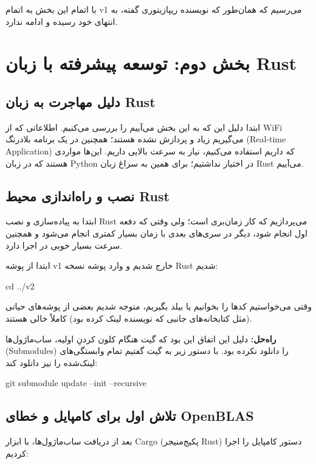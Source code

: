 \documentclass[12pt, a4paper]{article}
\newcommand{\lr}[1]{\foreignlanguage{english}{#1}}
\begin{document}
با اتمام این بخش به اتمام \lr{v1} می‌رسیم که همان‌طور که نویسنده ریپازیتوری گفته، به انتهای خود رسیده و ادامه ندارد.

\newpage
\section{بخش دوم: توسعه پیشرفته با زبان \lr{Rust}}

\subsection{دلیل مهاجرت به زبان \lr{Rust}}
ابتدا دلیل این که به این بخش می‌آییم را بررسی می‌کنیم. اطلاعاتی که از \lr{WiFi} می‌گیریم زیاد و پردازش نشده هستند؛ همچنین در یک برنامه بلادرنگ (\lr{Real-time Application}) که داریم استفاده می‌کنیم، نیاز به سرعت بالایی داریم. این‌ها مواردی هستند که در زبان \lr{Python} در اختیار نداشتیم؛ برای همین به سراغ زبان \lr{Rust} می‌آییم.

\subsection{نصب و راه‌اندازی محیط \lr{Rust}}
ابتدا به پیاده‌سازی و نصب \lr{Rust} می‌پردازیم که کار زمان‌بری است؛ ولی وقتی که دفعه اول انجام شود، دیگر در سری‌های بعدی با زمان بسیار کمتری انجام می‌شود و همچنین سرعت بسیار خوبی در اجرا دارد.

ابتدا از پوشه \lr{v1} خارج شدیم و وارد پوشه نسخه \lr{Rust} شدیم:

\begin{otherlanguage}{english}
\begin{terminalbox}
cd ../v2
\end{terminalbox}
\end{otherlanguage}

وقتی می‌خواستیم کدها را بخوانیم یا بیلد بگیریم، متوجه شدیم بعضی از پوشه‌های حیاتی (مثل کتابخانه‌های جانبی که نویسنده لینک کرده بود) کاملاً خالی هستند.

\textbf{راه‌حل:} دلیل این اتفاق این بود که گیت هنگام کلون کردنِ اولیه، ساب‌ماژول‌ها (\lr{Submodules}) را دانلود نکرده بود. با دستور زیر به گیت گفتیم تمام وابستگی‌های لینک‌شده را نیز دانلود کند:

\begin{otherlanguage}{english}
\begin{terminalbox}
git submodule update --init --recursive
\end{terminalbox}
\end{otherlanguage}

\subsection{تلاش اول برای کامپایل و خطای \lr{OpenBLAS}}
بعد از دریافت ساب‌ماژول‌ها، با ابزار \lr{Cargo} (پکیج‌منیجر \lr{Rust}) دستور کامپایل را اجرا کردیم:
\end{document}
